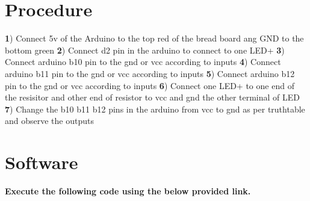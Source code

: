 \documentclass[12pt, a4paper]{article}
\begin{document}
\vspace{5mm}



\section{Procedure}

\textbf 1) Connect 5v of the Arduino to the top red of the bread board ang GND to the bottom green
\hfill \break
\hfill \break
\textbf 2) Connect d2 pin in the arduino to connect to one LED+
\hfill \break
\hfill \break
\textbf 3) Connect arduino b10 pin to the gnd or vcc according to inputs
\hfill \break
\hfill \break
\textbf 4) Connect arduino b11 pin to the gnd or vcc according to inputs
\hfill \break
\hfill \break
\textbf 5) Connect arduino b12 pin to the gnd or vcc according to inputs
\hfill \break
\hfill \break
\textbf 6) Connect one LED+ to one end of the resisitor and other end of resistor to vcc and gnd the other terminal of LED
\hfill \break
\hfill \break
\textbf 7) Change the b10 b11 b12 pins in the arduino from vcc to gnd as per truthtable and observe the outputs
\hfill \break

\vspace{5mm}



\section{Software}
\textbf{Execute the following code using the below provided link.}\\
\begin{center}
\end{center}
 

\vspace{5mm}  


\end{document}
